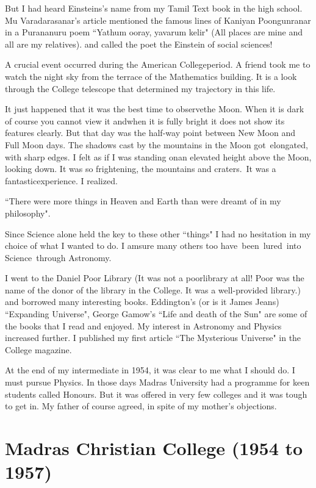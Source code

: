 But I had heard Einsteins's name from my Tamil Text book in the high 
school. Mu Varadarasanar's article mentioned the famous lines of Kaniyan 
Poongunranar in a Purananuru poem ``Yathum ooray, yavarum kelir"
(All places are mine and all are my relatives).
and called the poet the Einstein of social sciences!   


A crucial event occurred during the American College\break period. A friend 
took me to watch the night sky from the terrace\- of the Mathematics 
building. It is a look through the College telescope that determined my 
trajectory in this life.


It just happened that it was the best time to observe\break the Moon. When it 
is dark of course you cannot view it and\break when it is fully bright it does 
not show its features clearly. But that day was the half-way point 
between New Moon and Full Moon days. The shadows cast by the mountains 
in the Moon got\ elongated, with sharp edges. I felt as if I was standing 
on\break an elevated height above the Moon, looking down. It was so 
frightening, the mountains and craters.\ It was a fantastic\break experience. I 
realized.


``There were more things in Heaven and Earth than were dreamt of in my 
philosophy".


Since Science alone held the key to these other ``things" I had no 
hesitation in my choice of what I wanted to do. I am\break sure many others 
too have \,been \,lured \,into \,Science \,through Astronomy.


I went to the Daniel Poor Library (It was not a poor\break library at all! 
Poor was the name of the donor of the library in the College. It was a 
well-provided library.) and borrowed many interesting books. Eddington's 
(or is it James Jeans) ``Expanding Universe", George Gamow's ``Life and 
death of the Sun" are some of the books that I read and enjoyed. My 
interest in Astronomy and Physics increased further. I published my 
first article ``The Mysterious Universe" in the College magazine.

At the end of my intermediate in 1954, it was clear to me what I should 
do. I must pursue Physics. In those days Madras University had a 
programme for keen students called Honours. But it was offered in very 
few colleges and it was tough to get in. My father of course agreed, 
in spite of my mother's objections.
\vspace{-\topsep}
\section*{Madras Christian College (1954 to 1957)}

